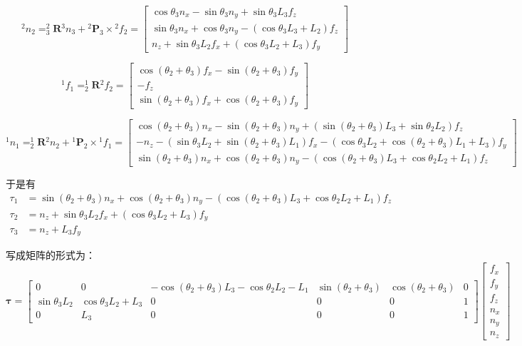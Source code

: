 \documentclass{homework}
\begin{document}
\begin{sol}
\[
  {^2}n_2 = _3^2\mathbf{R} {^3}n_3 + {^2}\mathbf{P}_3 \times {^2}f_2 =
  \begin{bmatrix}
    \cos\theta_3 n_x - \sin\theta_3 n_y + \sin\theta_3 L_3 f_z \\
    \sin\theta_3 n_x + \cos\theta_3 n_y - (\cos\theta_3 L_3 + L_2) f_z \\
    n_z + \sin\theta_3 L_2 f_x + (\cos\theta_3 L_2 + L_3) f_y
  \end{bmatrix}
\]

\[
  {^1}f_1 = _2^1\mathbf{R} {^2}f_2 =
  \begin{bmatrix}
    \cos(\theta_2 + \theta_3) f_x - \sin(\theta_2 + \theta_3) f_y \\
    -f_z \\
    \sin(\theta_2 + \theta_3) f_x + \cos(\theta_2 + \theta_3) f_y
  \end{bmatrix}
\]

\[
  {^1}n_1 = _2^1\mathbf{R} {^2}n_2 + {^1}\mathbf{P}_2 \times {^1}f_1 =
  \begin{bmatrix}
    \cos(\theta_2 + \theta_3) n_x - \sin(\theta_2 + \theta_3) n_y + (\sin(\theta_2 + \theta_3) L_3 + \sin\theta_2 L_2) f_z \\
    -n_z - (\sin\theta_3 L_2 + \sin(\theta_2 + \theta_3) L_1) f_x - (\cos\theta_3 L_2 + \cos(\theta_2 + \theta_3) L_1 + L_3) f_y \\
    \sin(\theta_2 + \theta_3) n_x + \cos(\theta_2 + \theta_3) n_y - (\cos(\theta_2 + \theta_3) L_3 + \cos\theta_2 L_2 + L_1) f_z
  \end{bmatrix}
\]

于是有
\begin{align*}
  \tau_1 & = \sin(\theta_2 + \theta_3) n_x + \cos(\theta_2 + \theta_3) n_y - (\cos(\theta_2 + \theta_3) L_3 + \cos\theta_2 L_2 + L_1) f_z \\
  \tau_2 & = n_z + \sin\theta_3 L_2 f_x + (\cos\theta_3 L_2 + L_3) f_y \\
  \tau_3 & = n_z + L_3 f_y
\end{align*}

写成矩阵的形式为：
\[
  \boldsymbol{\tau} =
  \begin{bmatrix}
    0 & 0 & -\cos(\theta_2 + \theta_3) L_3 - \cos\theta_2 L_2 - L_1 & \sin(\theta_2 + \theta_3) & \cos(\theta_2 + \theta_3) & 0 \\
    \sin\theta_3 L_2 & \cos\theta_3 L_2 + L_3 & 0 & 0 & 0 & 1 \\
    0 & L_3 & 0 & 0 & 0 & 1
  \end{bmatrix}
  \begin{bmatrix}
    f_x \\
    f_y \\
    f_z \\
    n_x \\
    n_y \\
    n_z
  \end{bmatrix}
\]


\end{sol}
\end{document}
